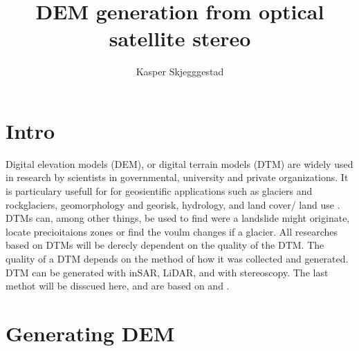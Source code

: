 \documentclass[a4paper,UKenglish]{article}
\title{DEM generation from optical satellite stereo}
\author{Kasper Skjegggestad}
\begin{document}
\maketitle
\tableofcontents

\section{Intro}

Digital elevation models (DEM), or digital terrain models (DTM) are widely used in research by scientists in governmental, university and private organizations. It is particulary usefull for for geosientific applications such as glaciers and rockglaciers, geomorphology and georisk, hydrology, and land cover/ land use \citep{toutin08}. DTMs can, among other things, be used to find were a landslide might originate, locate precioitaions zones or find the voulm changes if a glacier. All researches based on DTMs will be derecly dependent on the quality of the DTM. The quality of a DTM depends on the method of how it was collected and generated. DTM can be generated with inSAR, LiDAR, and with stereoscopy. The last methot will be disscued here, and are based on \cite{toutin08} and \cite{toutin01}. 

\section{Generating DEM}
\end{document}

